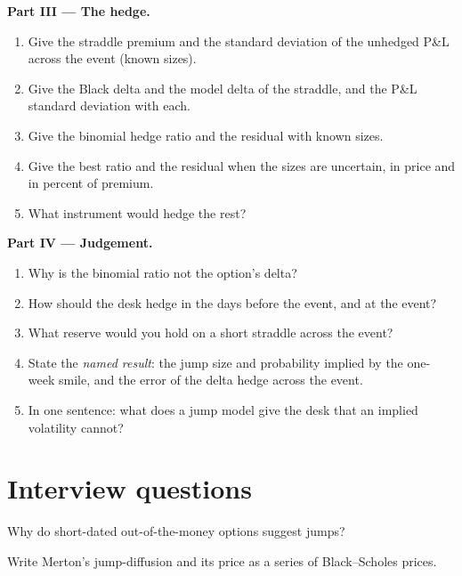 \begin{problem}
\medskip\noindent\textbf{Part III --- The hedge.}
\begin{enumerate}[resume]
\item Give the straddle premium and the standard deviation of the unhedged P\&L across the event (known sizes).
\item Give the Black delta and the model delta of the straddle, and the P\&L standard deviation with each.
\item Give the binomial hedge ratio and the residual with known sizes.
\item Give the best ratio and the residual when the sizes are uncertain, in price and in percent of premium.
\item What instrument would hedge the rest?
\end{enumerate}

\medskip\noindent\textbf{Part IV --- Judgement.}
\begin{enumerate}[resume]
\item Why is the binomial ratio not the option's delta?
\item How should the desk hedge in the days before the event, and at the event?
\item What reserve would you hold on a short straddle across the event?
\item State the \emph{named result}: the jump size and probability implied by the one-week smile, and the error of
the delta hedge across the event.
\item In one sentence: what does a jump model give the desk that an implied volatility cannot?
\end{enumerate}
\end{problem}

\section{Interview questions}

\begin{interviewq}\label{iq:dv:jumps-and-levy-models:1}
Why do short-dated out-of-the-money options suggest jumps?
\end{interviewq}

\begin{interviewq}\label{iq:dv:jumps-and-levy-models:2}
Write Merton's jump-diffusion and its price as a series of Black--Scholes prices.
\end{interviewq}

